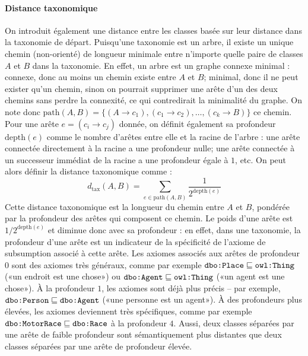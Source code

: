 
\paragraph{Distance taxonomique}
On introduit également une distance entre les classes basée sur leur distance dans la taxonomie de départ. Puisqu'une taxonomie est un arbre, il existe un unique chemin (non-orienté) de longueur minimale entre n'importe quelle paire de classes $A$ et $B$ dans la taxonomie. En effet, un arbre est un graphe connexe minimal : connexe, donc au moins un chemin existe entre $A$ et $B$; minimal, donc il ne peut exister qu'un chemin, sinon on pourrait supprimer une arête d'un des deux chemins sans perdre la connexité, ce qui contredirait la minimalité du graphe. On note donc $\text{path}(A, B) = \{(A \rightarrow c_1), (c_1 \rightarrow c_2), \ldots, (c_k \rightarrow B)\}$ ce chemin. Pour une arête $e = (c_i \rightarrow c_j)$ donnée, on définit également sa profondeur $\text{depth}(e)$ comme le nombre d'arêtes entre elle et la racine de l'arbre : une arête connectée directement à la racine a une profondeur nulle; une arête connectée à un successeur immédiat de la racine a une profondeur égale à $1$, etc.
On peut alors définir la distance taxonomique comme :
\begin{equation}
    d_\text{tax}(A, B) = \sum_{e \in \text{path}(A, B)} \frac{1}{\displaystyle 2^{\text{depth}(e)}}
\end{equation}
Cette distance taxonomique est la longueur du chemin entre $A$ et $B$, pondérée par la profondeur des arêtes qui composent ce chemin. Le poids d'une arête est $1/2^{\text{depth}(e)}$ et diminue donc avec sa profondeur : en effet, dans une taxonomie, la profondeur d'une arête est un indicateur de la spécificité de l'axiome de subsumption associé à cette arête. Les axiomes associés aux arêtes de profondeur $0$ sont des axiomes très généraux, comme par exemple $\texttt{dbo:Place} \sqsubseteq \texttt{owl:Thing}$ («un endroit est une chose») ou $\texttt{dbo:Agent} \sqsubseteq \texttt{owl:Thing}$ («un agent est une chose»). À la profondeur $1$, les axiomes sont déjà plus précis – par exemple, $\texttt{dbo:Person}\sqsubseteq \texttt{dbo:Agent}$ («une personne est un agent»). À des profondeurs plus élevées, les axiomes deviennent très spécifiques, comme par exemple $\texttt{dbo:MotorRace} \sqsubseteq \texttt{dbo:Race}$ à la profondeur $4$. Aussi, deux classes séparées par une arête de faible profondeur sont sémantiquement plus distantes que deux classes séparées par une arête de profondeur élevée.

